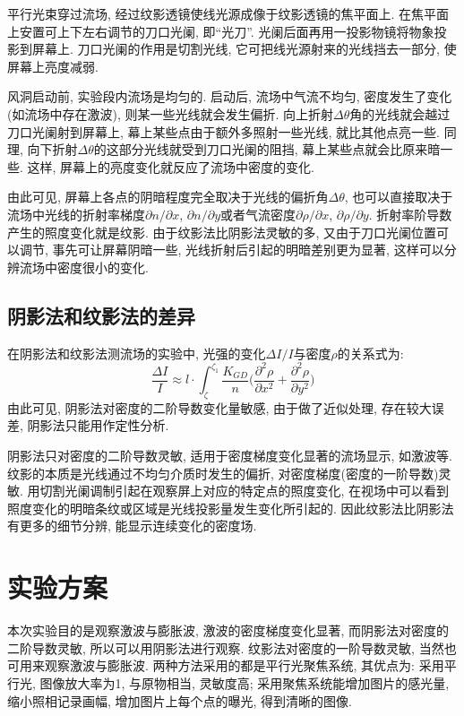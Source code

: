 \documentclass[12pt,a4paper,boxed,titlepage]{caspset}
\begin{document}
平行光束穿过流场, 经过纹影透镜使线光源成像于纹影透镜的焦平面上. 在焦平面上安置可上下左右调节的刀口光阑, 即``光刀''. 光阑后面再用一投影物镜将物象投影到屏幕上. 刀口光阑的作用是切割光线, 它可把线光源射来的光线挡去一部分, 使屏幕上亮度减弱.

风洞启动前, 实验段内流场是均匀的. 启动后, 流场中气流不均匀, 密度发生了变化(如流场中存在激波), 则某一些光线就会发生偏折. 向上折射$\Delta\theta$角的光线就会越过刀口光阑射到屏幕上, 幕上某些点由于额外多照射一些光线, 就比其他点亮一些. 同理, 向下折射$\Delta\theta$的这部分光线就受到刀口光阑的阻挡, 幕上某些点就会比原来暗一些. 这样, 屏幕上的亮度变化就反应了流场中密度的变化.

由此可见, 屏幕上各点的阴暗程度完全取决于光线的偏折角$\Delta\theta$, 也可以直接取决于流场中光线的折射率梯度$\partial n/\partial x$, $\partial n/\partial y$或者气流密度$\partial\rho/\partial x$, $\partial
\rho/\partial y$. 折射率阶导数产生的照度变化就是纹影. 由于纹影法比阴影法灵敏的多, 又由于刀口光阑位置可以调节, 事先可让屏幕阴暗一些, 光线折射后引起的明暗差别更为显著, 这样可以分辨流场中密度很小的变化.

\subsection{阴影法和纹影法的差异}\label{diff}

在阴影法和纹影法测流场的实验中, 光强的变化$\Delta I/I$与密度$\rho$的关系式为:
\[
\frac{\Delta I}{I} \approx
l \cdot
\int_\zeta^{\zeta_1}
\frac{K_{GD}}{n}\Big(
\frac{\partial^2\rho}{\partial x^2} + \frac{\partial^2\rho}{\partial y^2}
\Big)
\]
由此可见, 阴影法对密度的二阶导数变化量敏感, 由于做了近似处理, 存在较大误差, 阴影法只能用作定性分析.

阴影法只对密度的二阶导数灵敏, 适用于密度梯度变化显著的流场显示, 如激波等.
纹影的本质是光线通过不均匀介质时发生的偏折, 对密度梯度(密度的一阶导数)灵敏. 用切割光阑调制引起在观察屏上对应的特定点的照度变化, 在视场中可以看到照度变化的明暗条纹或区域是光线投影量发生变化所引起的.
因此纹影法比阴影法有更多的细节分辨, 能显示连续变化的密度场.




\section{实验方案}
本次实验目的是观察激波与膨胀波, 激波的密度梯度变化显著, 而阴影法对密度的二阶导数灵敏, 所以可以用阴影法进行观察. 纹影法对密度的一阶导数灵敏, 当然也可用来观察激波与膨胀波. 两种方法采用的都是平行光聚焦系统, 其优点为: 采用平行光, 图像放大率为1, 与原物相当, 灵敏度高; 采用聚焦系统能增加图片的感光量, 缩小照相记录画幅, 增加图片上每个点的曝光, 得到清晰的图像.
\end{document}
